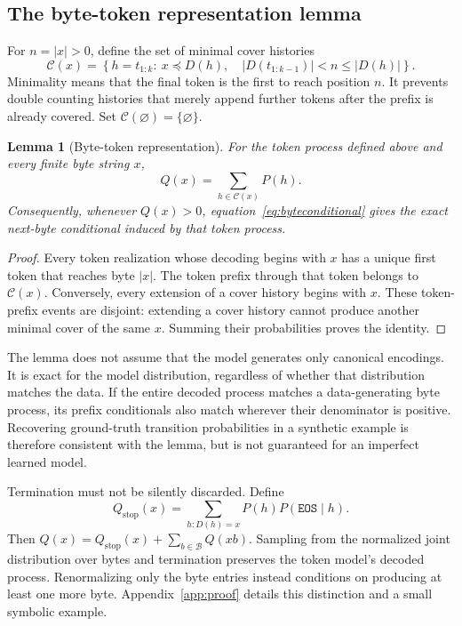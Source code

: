 \documentclass{article}
\newtheorem{lemma}{Lemma}
\newcommand{\bytes}{\mathcal{B}}
\newcommand{\covers}{\mathcal{C}}
\newcommand{\eos}{\mathtt{EOS}}
\newcommand{\dec}{D}
\newcommand{\pref}{\preceq}
\begin{document}
\subsection{The byte-token representation lemma}
For $n=|x|>0$, define the set of minimal cover histories
\begin{equation}
 \covers(x)=\left\{h=t_{1:k}:\ x\pref\dec(h),\quad
             |\dec(t_{1:k-1})|<n\leq |\dec(h)|\right\}.
 \label{eq:covers}
\end{equation}
Minimality means that the final token is the first to reach position $n$. It prevents double counting histories that merely append further tokens after the prefix is already covered. Set $\covers(\varnothing)=\{\varnothing\}$.

\begin{lemma}[Byte-token representation]
\label{lem:representation}
For the token process defined above and every finite byte string $x$,
\begin{equation}
 Q(x)=\sum_{h\in\covers(x)}P(h).
 \label{eq:representation}
\end{equation}
Consequently, whenever $Q(x)>0$, equation~\ref{eq:byteconditional} gives the exact next-byte conditional induced by that token process.
\end{lemma}
\begin{proof}
Every token realization whose decoding begins with $x$ has a unique first token that reaches byte $|x|$. The token prefix through that token belongs to $\covers(x)$. Conversely, every extension of a cover history begins with $x$. These token-prefix events are disjoint: extending a cover history cannot produce another minimal cover of the same $x$. Summing their probabilities proves the identity.
\end{proof}

The lemma does not assume that the model generates only canonical encodings. It is exact for the model distribution, regardless of whether that distribution matches the data. If the entire decoded process matches a data-generating byte process, its prefix conditionals also match wherever their denominator is positive. Recovering ground-truth transition probabilities in a synthetic example is therefore consistent with the lemma, but is not guaranteed for an imperfect learned model.

Termination must not be silently discarded. Define
\begin{equation}
 Q_{\mathrm{stop}}(x)=\sum_{h:\dec(h)=x}P(h)P(\eos\mid h).
 \label{eq:stop}
\end{equation}
Then $Q(x)=Q_{\mathrm{stop}}(x)+\sum_{b\in\bytes}Q(xb)$. Sampling from the normalized joint distribution over bytes and termination preserves the token model's decoded process. Renormalizing only the byte entries instead conditions on producing at least one more byte. Appendix~\ref{app:proof} details this distinction and a small symbolic example.
\end{document}
